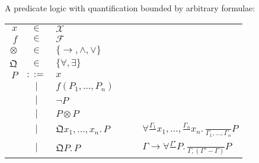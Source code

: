 \documentclass[11pt]{article} %
\theoremstyle{definition}
\begin{document}
A predicate logic with quantification bounded by arbitrary formulae:
\newline
\begin{tabular}{rclcl}
$x$ & $\in$ & $\mathcal{X}$ &$\quad$& \\
$f$ & $\in$ & $\mathcal{F}$ \\
$\otimes$ & $\in$ & $\{\to, \land, \lor\}$ \\
$\mathfrak{Q}$ & $\in$ & $\{\forall, \exists\}$ \\
$P$ & $::=$ & $x$ && \\
& $\mid$ & $f(P_1, \ldots, P_n)$ &&  \\
& $\mid$ & $\neg P$ &&  \\
& $\mid$ & $P \otimes P$ &&  \\
& $\mid$ & $\mathfrak{Q} x_1,\ldots, x_n.\,P$
    && $\forall \frac{\Gamma_1}{}x_1,\ldots, \frac{\Gamma_n}{}x_n.\,\frac{}{\Gamma_1,\ldots,\Gamma_n}P$ \\
& $\mid$ & $\mathfrak{Q} P.\,P$
    && $\Gamma \to \forall \frac{\Gamma'}{}P.\,\frac{}{\Gamma,(\Gamma' - \Gamma)}P$ \\
\end{tabular}
\end{document}
